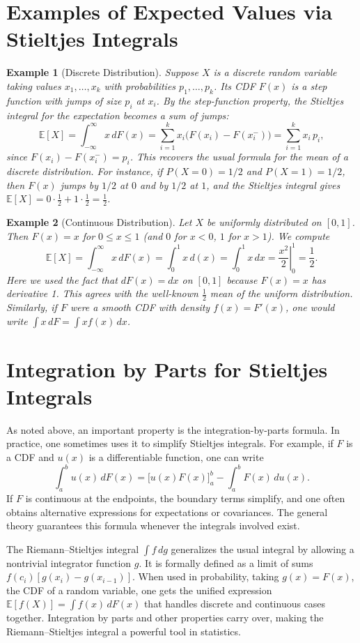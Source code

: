 \documentclass[11pt,a4paper]{article}
\newtheorem{example}{Example}[section]
\begin{document}
\section{Examples of Expected Values via Stieltjes Integrals}
\begin{example}[Discrete Distribution]
Suppose $X$ is a discrete random variable taking values $x_1,\dots,x_k$ with probabilities $p_1,\dots,p_k$.  Its CDF $F(x)$ is a step function with jumps of size $p_i$ at $x_i$.  By the step-function property, the Stieltjes integral for the expectation becomes a sum of jumps:
\[
\mathbb{E}[X] 
= \int_{-\infty}^\infty x\,dF(x)
= \sum_{i=1}^k x_i\bigl(F(x_i)-F(x_i^-)\bigr) 
= \sum_{i=1}^k x_i\,p_i,
\]
since $F(x_i)-F(x_i^-)=p_i$.  This recovers the usual formula for the mean of a discrete distribution.  For instance, if $P(X=0)=1/2$ and $P(X=1)=1/2$, then $F(x)$ jumps by $1/2$ at $0$ and by $1/2$ at $1$, and the Stieltjes integral gives $\mathbb{E}[X]=0\cdot\tfrac12 + 1\cdot\tfrac12 = \tfrac12$.
\end{example}

\begin{example}[Continuous Distribution]
Let $X$ be uniformly distributed on $[0,1]$.  Then $F(x)=x$ for $0\le x\le 1$ (and $0$ for $x<0$, $1$ for $x>1$).  We compute
\[
\mathbb{E}[X] 
= \int_{-\infty}^\infty x\,dF(x) 
= \int_{0}^1 x\,d(x)
= \int_{0}^1 x\,dx 
= \left.\frac{x^2}{2}\right|_{0}^{1} 
= \frac12.
\]
Here we used the fact that $dF(x)=dx$ on $[0,1]$ because $F(x)=x$ has derivative 1.  This agrees with the well-known $\frac{1}{2}$ mean of the uniform distribution.  Similarly, if $F$ were a smooth CDF with density $f(x)=F'(x)$, one would write $\int x\,dF = \int x f(x)\,dx$.
\end{example}

\section{Integration by Parts for Stieltjes Integrals}
As noted above, an important property is the integration-by-parts formula.  In practice, one sometimes uses it to simplify Stieltjes integrals.  For example, if $F$ is a CDF and $u(x)$ is a differentiable function, one can write 
\[
\int_a^b u(x)\,dF(x)
= \bigl[u(x)F(x)\bigr]_a^b - \int_a^b F(x)\,du(x).
\]
If $F$ is continuous at the endpoints, the boundary terms simplify, and one often obtains alternative expressions for expectations or covariances.  The general theory guarantees this formula whenever the integrals involved exist.

\bigskip
{} The Riemann--Stieltjes integral $\int f\,dg$ generalizes the usual integral by allowing a nontrivial integrator function $g$.  It is formally defined as a limit of sums $f(c_i)[g(x_i)-g(x_{i-1})]$.  When used in probability, taking $g(x)=F(x)$, the CDF of a random variable, one gets the unified expression $\mathbb{E}[f(X)] = \int f(x)\,dF(x)$ that handles discrete and continuous cases together.  Integration by parts and other properties carry over, making the Riemann--Stieltjes integral a powerful tool in statistics.
\end{document}
